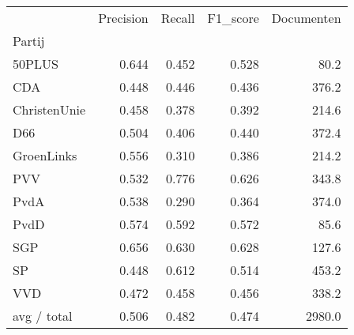 \begin{tabular}{lrrrr}
\toprule
{} &  Precision &  Recall &  F1\_score &  Documenten \\
Partij       &            &         &           &             \\
\midrule
50PLUS       &      0.644 &   0.452 &     0.528 &        80.2 \\
   CDA       &      0.448 &   0.446 &     0.436 &       376.2 \\
ChristenUnie &      0.458 &   0.378 &     0.392 &       214.6 \\
   D66       &      0.504 &   0.406 &     0.440 &       372.4 \\
  GroenLinks &      0.556 &   0.310 &     0.386 &       214.2 \\
   PVV       &      0.532 &   0.776 &     0.626 &       343.8 \\
  PvdA       &      0.538 &   0.290 &     0.364 &       374.0 \\
  PvdD       &      0.574 &   0.592 &     0.572 &        85.6 \\
   SGP       &      0.656 &   0.630 &     0.628 &       127.6 \\
    SP       &      0.448 &   0.612 &     0.514 &       453.2 \\
   VVD       &      0.472 &   0.458 &     0.456 &       338.2 \\
 avg / total &      0.506 &   0.482 &     0.474 &      2980.0 \\
\bottomrule
\end{tabular}
